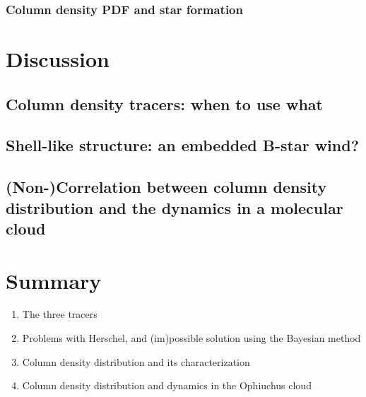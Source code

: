 \documentclass{emulateapj}
\begin{document}
\subsubsection{Column density PDF and star formation}

\section{Discussion}
\label{sec:discussion}

\subsection{Column density tracers: when to use what}

\subsection{Shell-like structure: an embedded B-star wind?}

\subsection{(Non-)Correlation between column density distribution and the dynamics in a molecular cloud}

\section{Summary}
\label{sec:summary}

\begin{enumerate}
\item The three tracers
\item Problems with Herschel, and (im)possible solution using the Bayesian method
\item Column density distribution and its characterization
\item Column density distribution and dynamics in the Ophiuchus cloud
\end{enumerate}

%


\end{document}
